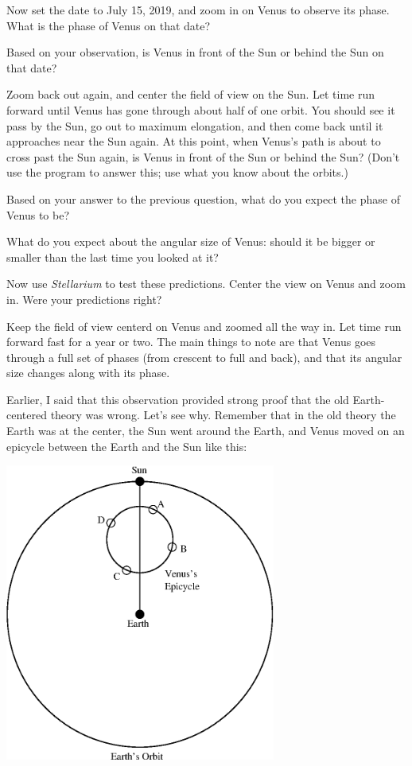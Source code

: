 \answerspace{ 0.7in}

\pagebreak[2]
Now set the date to July 15, 2019, and 
zoom in on Venus to observe its phase.  What is the phase of Venus on that date?

\answerspace{ 0.7in}

Based on your observation, is Venus in front of the Sun or behind the Sun
on that date?

\answerspace{ 0.7in}


Zoom back out again, and center the field of view on the Sun.  Let time
run forward until Venus has gone through about half of one orbit.  You
should see it pass by the Sun, go out to maximum elongation, and then come
back until it approaches near the Sun again.  At this point, when
Venus's path is about to cross past the Sun again, is Venus in front
of the Sun or behind the Sun?  (Don't use the program to answer this; 
use what you know about the orbits.)

\answerspace{ 0.7in}

Based on your answer to the previous question, what do you expect the 
phase of Venus to be?

\answerspace{ 0.7in}

What do you expect about the angular size of Venus: should it be bigger
or smaller than the last time you looked at it?

\answerspace{ 0.7in}

Now use \textit{Stellarium} to
test these predictions.
Center the view on Venus and zoom in.
Were your predictions right?

\answerspace{ 0.7in}

\pagebreak[2]
Keep the field of view centerd on Venus and zoomed all the way in.  Let time
run forward fast for a year or two.  The main things to note are that
Venus goes through a full set of phases (from crescent to full and back),
and that its angular size changes along with its phase.

Earlier, I said that this observation provided strong proof that
the old Earth-centered theory was wrong.  Let's see why.  Remember that
in the old theory the Earth was at the center, the Sun went around the
Earth, and Venus moved on an epicycle between the Earth and the Sun like this:


\centerline{\includegraphics[width=3.5in]{phasesofvenus/venus2.eps}}


